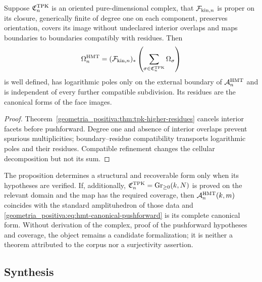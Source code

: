 \begin{proposition}
\label{geometria_positiva:thm:hmt-amplituhedron-form} Suppose \(\mathfrak C_n^{\rm TPK}\) is an oriented pure-dimensional complex, that \(\mathcal F_{{\rm kin},n}\) is proper on its closure, generically finite of degree one on each component, preserves orientation, covers its image without undeclared interior overlaps and maps boundaries to boundaries compatibly with residues. Then
\begin{equation}
 \Omega_n^{\rm HMT}
 =(\mathcal F_{{\rm kin},n})_*
 \left(\sum_{\sigma\in\mathfrak C_n^{\rm TPK}}\Omega_\sigma\right)
 \label{geometria_positiva:eq:hmt-canonical-pushforward}
\end{equation}
is well defined, has logarithmic poles only on the external boundary of \(\mathcal A_n^{\rm HMT}\) and is independent of every further compatible subdivision. Its residues are the canonical forms of the face images.
\end{proposition}
\begin{proof}
Theorem~\ref{geometria_positiva:thm:tpk-higher-residues} cancels interior facets before pushforward. Degree one and absence of interior overlaps prevent spurious multiplicities; boundary--residue compatibility transports logarithmic poles and their residues. Compatible refinement changes the cellular decomposition but not its sum.
\end{proof}

The proposition determines a structural and recoverable form only when its hypotheses are verified. If, additionally, \(\mathfrak C_n^{\rm TPK}=\operatorname{Gr}_{\ge0}(k,N)\) is proved on the relevant domain and the map has the required coverage, then \(\mathcal A_n^{\rm HMT}(k,m)\) coincides with the standard amplituhedron of those data and \eqref{geometria_positiva:eq:hmt-canonical-pushforward} is its complete canonical form. Without derivation of the complex, proof of the pushforward hypotheses and coverage, the object remains a candidate formalization; it is neither a theorem attributed to the corpus nor a surjectivity assertion.

\subsection{Synthesis}

